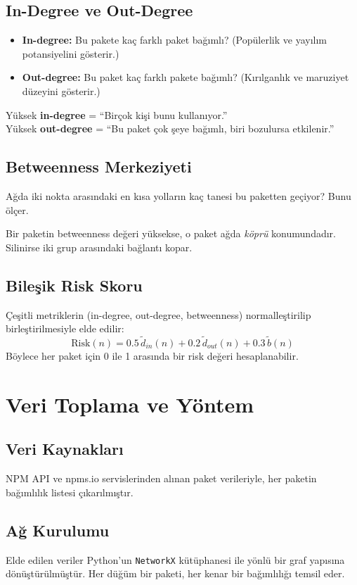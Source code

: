 \documentclass[11pt,a4paper]{article}
\begin{document}
\subsection{In-Degree ve Out-Degree}
\begin{itemize}
  \item \textbf{In-degree:} Bu pakete kaç farklı paket bağımlı? (Popülerlik ve yayılım potansiyelini gösterir.)
  \item \textbf{Out-degree:} Bu paket kaç farklı pakete bağımlı? (Kırılganlık ve maruziyet düzeyini gösterir.)
\end{itemize}

\begin{tipbox}
Yüksek \textbf{in-degree} = “Birçok kişi bunu kullanıyor.” \\
Yüksek \textbf{out-degree} = “Bu paket çok şeye bağımlı, biri bozulursa etkilenir.”
\end{tipbox}

\subsection{Betweenness Merkeziyeti}
Ağda iki nokta arasındaki en kısa yolların kaç tanesi bu paketten geçiyor? Bunu ölçer. 
\begin{tipbox}
Bir paketin betweenness değeri yüksekse, o paket ağda \emph{köprü} konumundadır. Silinirse iki grup arasındaki bağlantı kopar.
\end{tipbox}

\subsection{Bileşik Risk Skoru}
Çeşitli metriklerin (in-degree, out-degree, betweenness) normalleştirilip birleştirilmesiyle elde edilir:
\[\text{Risk}(n) = 0.5\,\tilde d_{in}(n) + 0.2\,\tilde d_{out}(n) + 0.3\,\tilde b(n)\]
Böylece her paket için 0 ile 1 arasında bir risk değeri hesaplanabilir.

\section{Veri Toplama ve Yöntem}
\subsection{Veri Kaynakları}
NPM API ve npms.io servislerinden alınan paket verileriyle, her paketin bağımlılık listesi çıkarılmıştır.

\subsection{Ağ Kurulumu}
Elde edilen veriler Python’un \texttt{NetworkX} kütüphanesi ile yönlü bir graf yapısına dönüştürülmüştür. Her düğüm bir paketi, her kenar bir bağımlılığı temsil eder.
\end{document}
